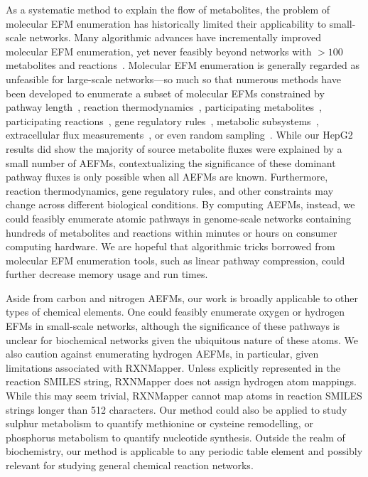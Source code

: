 \documentclass[12pt]{article}
\begin{document}
As a systematic method to explain the flow of metabolites, the problem of
molecular EFM enumeration has historically limited their applicability to
small-scale networks. Many algorithmic advances have incrementally
improved molecular EFM enumeration, yet never feasibly beyond networks
with $>100$ metabolites and
reactions~\citep{KampAxelvon2006M5fa,TerzerMarco2008Lcoe,vanKlinkenJanBert2016Faet}.
Molecular EFM enumeration is generally regarded as unfeasible for
large-scale networks---so much so that numerous methods have been
developed to enumerate a subset of molecular EFMs constrained by pathway
length~\citep{deFigueiredoLuisF2009Ctse}, reaction
thermodynamics~\citep{GerstlMatthiasP2015Mief}, participating
metabolites~\citep{PeyJon2014Dcoe}, participating
reactions~\citep{KaletaChristoph2009Ctwb}, gene regulatory
rules~\citep{JungreuthmayerChristian2013rSue}, metabolic
subsystems~\citep{SchusterS2002Etps,SchwartzJean-Marc2007Omfa},
extracellular flux
measurements~\citep{SoonsZitaITA2011Iomm,JungersRaphaelM.2011Fcom}, or
even random sampling~\citep{MachadoDaniel2012Rsoe}. While our HepG2
results did show the majority of source metabolite fluxes were explained
by a small number of AEFMs, contextualizing the significance of these
dominant pathway fluxes is only possible when all AEFMs are known.
Furthermore, reaction thermodynamics, gene regulatory rules, and other
constraints may change across different biological conditions. By
computing AEFMs, instead, we could feasibly enumerate atomic pathways in
genome-scale networks containing hundreds of metabolites and reactions
within minutes or hours on consumer computing hardware. We are hopeful
that algorithmic tricks borrowed from molecular EFM enumeration tools,
such as linear pathway compression, could further decrease memory usage
and run times.

Aside from carbon and nitrogen AEFMs, our work is broadly applicable to
other types of chemical elements. One could feasibly enumerate oxygen or
hydrogen EFMs in small-scale networks, although the significance of these
pathways is unclear for biochemical networks given the ubiquitous nature
of these atoms. We also caution against enumerating hydrogen AEFMs, in
particular, given limitations associated with RXNMapper. Unless explicitly
represented in the reaction SMILES string, RXNMapper does not assign
hydrogen atom mappings. While this may seem trivial, RXNMapper cannot map
atoms in reaction SMILES strings longer than 512 characters. Our method
could also be applied to study sulphur metabolism to quantify methionine
or cysteine remodelling, or phosphorus metabolism to quantify nucleotide
synthesis. Outside the realm of biochemistry, our method is applicable to
any periodic table element and possibly relevant for studying general
chemical reaction networks. 
\end{document}
